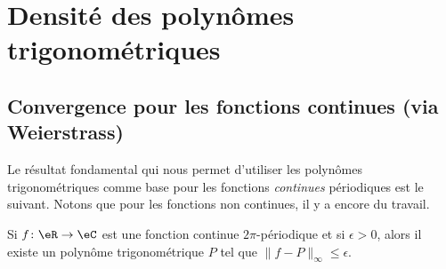 
\section{Densité des polynômes trigonométriques}

\subsection{Convergence pour les fonctions continues (via Weierstrass)}

Le résultat fondamental qui nous permet d'utiliser les polynômes trigonométriques comme base pour les fonctions \emph{continues} périodiques est le suivant. Notons que pour les fonctions non continues, il y a encore du travail.
\begin{lemma}   \label{LemXGYaRlC}
    Si \( f\colon \eR\to \eC\) est une fonction continue \( 2\pi\)-périodique et si \( \epsilon>0\), alors il existe un polynôme trigonométrique \( P\) tel que \( \| f-P \|_{\infty}\leq \epsilon\).
\end{lemma}

